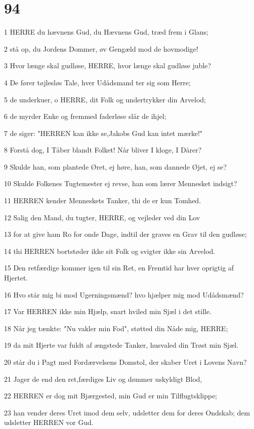 \chapter{94}

\par 1 HERRE du hævnens Gud, du Hævnens Gud, træd frem i Glans;
\par 2 stå op, du Jordens Dommer, øv Gengæld mod de hovmodige!
\par 3 Hvor længe skal gudløse, HERRE, hvor længe skal gudløse juble?
\par 4 De fører tøjlesløs Tale, hver Udådsmand ter sig som Herre;
\par 5 de underkuer, o HERRE, dit Folk og undertrykker din Arvelod;
\par 6 de myrder Enke og fremmed faderløse slår de ihjel;
\par 7 de siger: "HERREN kan ikke se,Jakobs Gud kan intet mærke!"
\par 8 Forstå dog, I Tåber blandt Folket! Når bliver I kloge, I Dårer?
\par 9 Skulde han, som plantede Øret, ej høre, han, som dannede Øjet, ej se?
\par 10 Skulde Folkenes Tugtemester ej revse, han som lærer Mennesket indsigt?
\par 11 HERREN kender Menneskets Tanker, thi de er kun Tomhed.
\par 12 Salig den Mand, du tugter, HERRE, og vejleder ved din Lov
\par 13 for at give ham Ro for onde Dage, indtil der graves en Grav til den gudløse;
\par 14 thi HERREN bortstøder ikke sit Folk og svigter ikke sin Arvelod.
\par 15 Den retfærdige kommer igen til sin Ret, en Fremtid har hver oprigtig af Hjertet.
\par 16 Hvo står mig bi mod Ugerningsmænd? hvo hjælper mig mod Udådsmænd?
\par 17 Var HERREN ikke min Hjælp, snart hviled min Sjæl i det stille.
\par 18 Når jeg tænkte: "Nu vakler min Fod", støtted din Nåde mig, HERRE;
\par 19 da mit Hjerte var fuldt af ængstede Tanker, husvaled din Trøst min Sjæl.
\par 20 står du i Pagt med Fordærvelsens Domstol, der skaber Uret i Lovens Navn?
\par 21 Jager de end den ret,færdiges Liv og dømmer uskyldigt Blod,
\par 22 HERREN er dog mit Bjærgested, min Gud er min Tilflugtsklippe;
\par 23 han vender deres Uret imod dem selv, udsletter dem for deres Ondskab; dem udsletter HERREN vor Gud.

